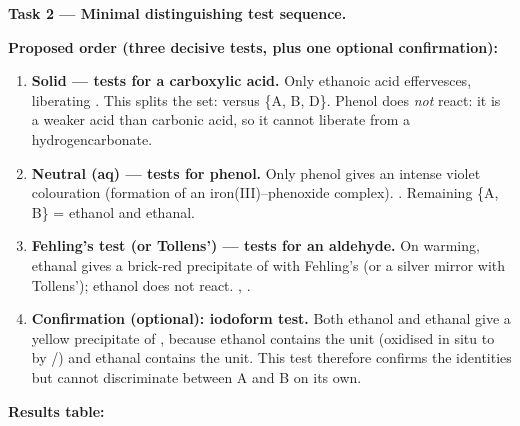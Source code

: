 \documentclass[11pt]{article}
\begin{document}
\textbf{Task 2 --- Minimal distinguishing test sequence.}\par
\textbf{Proposed order (three decisive tests, plus one optional confirmation):}
\begin{enumerate}
    \item \textbf{Solid  --- tests for a carboxylic acid.} Only ethanoic acid effervesces, liberating . This splits the set:  versus \{A, B, D\}. Phenol does \emph{not} react: it is a weaker acid than carbonic acid, so it cannot liberate  from a hydrogencarbonate.
    \item \textbf{Neutral (aq) --- tests for phenol.} Only phenol gives an intense violet colouration (formation of an iron(III)--phenoxide complex). . Remaining \{A, B\} = ethanol and ethanal.
    \item \textbf{Fehling's test (or Tollens') --- tests for an aldehyde.} On warming, ethanal gives a brick-red precipitate of  with Fehling's (or a silver mirror with Tollens'); ethanol does not react. , .
    \item \textbf{Confirmation (optional): iodoform test.} Both ethanol and ethanal give a yellow precipitate of , because ethanol contains the  unit (oxidised in situ to  by /) and ethanal contains the  unit. This test therefore confirms the identities but cannot discriminate between A and B on its own.
\end{enumerate}

\textbf{Results table:}
\end{document}
